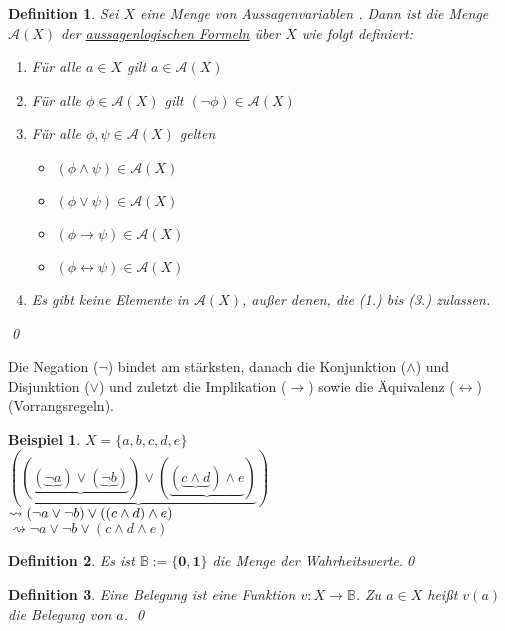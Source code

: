 \documentclass[ngerman]{scrartcl}
\theoremstyle{custom}
\newtheorem{mdef}{Definition} \numberwithin{mdef}{subsection}
\newtheorem*{ex}{Beispiel}
\newcommand{\0}{\mathbf{0}}
\newcommand{\1}{\mathbf{L}}
\begin{document}
\begin{mdef} Sei $X$ eine Menge von Aussagenvariablen . Dann ist die
  Menge $\mathcal{A}(X)$ der \underline{aussagenlogischen Formeln}
  \"uber $X$ wie folgt definiert:
\begin{enumerate}
\item F\"ur alle $a \in X$ gilt $a \in \mathcal{A}(X)$
\item F\"ur alle $\phi \in \mathcal{A}(X)$ gilt $(\neg \phi) \in
  \mathcal{A}(X)$
\item F\"ur alle $\phi, \psi \in \mathcal{A}(X)$ gelten
  \begin{itemize}
   \item $(\phi \wedge \psi) \in \mathcal{A}(X)$
   \item $(\phi \vee \psi) \in \mathcal{A}(X)$
   \item $(\phi \rightarrow \psi) \in \mathcal{A}(X)$
   \item $(\phi \leftrightarrow \psi) \in \mathcal{A}(X)$
    \end{itemize}
\item Es gibt keine Elemente in $\mathcal{A}(X)$, au\ss er denen, die
  (1.) bis (3.) zulassen.
\end{enumerate}
\qed
\end{mdef}

Die Negation ($\neg$) bindet am st\"arksten, danach die Konjunktion
($\wedge$) und Disjunktion ($\vee$) und zuletzt die Implikation
($\rightarrow$) sowie die \"Aquivalenz ($\leftrightarrow$) (Vorrangsregeln).

\begin{ex}
$X = \{a,b,c,d,e\}$\\
$(\underbrace{(\underbrace{(\underbrace{\neg a}) \vee (\underbrace{\neg b})}) \vee
(\underbrace{(\underbrace{c \wedge d}) \wedge e})})$ \\
$\huge\rightsquigarrow (\neg a \vee \neg b) \vee ((c
\wedge d) \wedge e)$ \\
$\rightsquigarrow \neg a \vee \neg b \vee (c
\wedge d \wedge e)$ \\
\end{ex}

\begin{mdef}Es ist $\mathds{B}:=\{\mathbf{0}, \mathbf{1}\}$ die Menge der
  Wahrheitswerte.\qed 
\end{mdef}
 
\begin{mdef} Eine \emph{Belegung} ist eine Funktion $v: X \rightarrow
  \mathds{B}$. Zu $a \in X$ hei\ss t $v(a)$ die \emph{Belegung} von
  $a$. \qed
\end{mdef}
\end{document}
